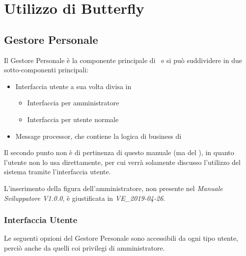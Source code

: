 \section{Utilizzo di Butterfly}\label{utilizzo}

\subsection{Gestore Personale}

Il Gestore Personale è la componente principale di \progetto\ e si può suddividere in due sotto-componenti principali:

\begin{itemize}
    \item Interfaccia utente a sua volta divisa in
    \begin{itemize}
    	\item Interfaccia per amministratore
    	\item Interfaccia per utente normale
    \end{itemize}
    \item Message processor, che contiene la logica di business di \progetto
\end{itemize}

Il secondo punto non è di pertinenza di questo manuale (ma del \MSd), in quanto l'utente non lo usa direttamente, per cui verrà solamente discusso l'utilizzo del sistema tramite l'interfaccia utente. \par
L'inserimento della figura dell'amministratore, non presente nel \textit{Manuale Sviluppatore V1.0.0}, è giustificata in \textit{VE\_2019-04-26}.

\subsubsection{Interfaccia Utente}
Le seguenti opzioni del Gestore Personale sono accessibili da ogni tipo utente, perciò anche da quelli coi privilegi di amministratore.

